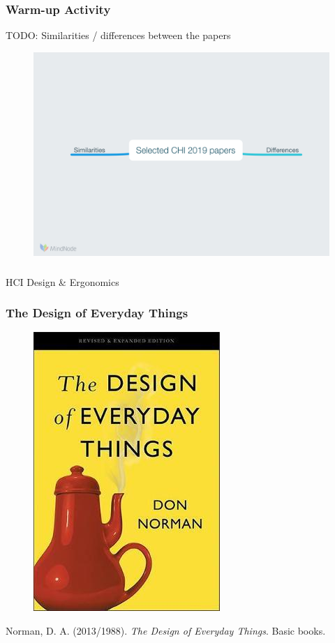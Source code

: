 \documentclass[screen, aspectratio=169]{beamer}
\begin{document}
%
\begin{frame}
\frametitle{Warm-up Activity}
TODO: Similarities / differences between the papers
 \begin{figure}
	\includegraphics[scale=0.28]{img/mindmap-selected-papers.png}
    \end{figure}
\end{frame}
%
%
\begin{frame}
\frametitle{}
\Huge{HCI Design \& Ergonomics}
\end{frame}
%
\begin{frame}
\frametitle{The Design of Everyday Things}
 \begin{figure}
	\includegraphics[scale=0.35]{img/Donald-Norman-The-Design-of-Everyday-Things.jpg}
    \end{figure}
    Norman, D. A. (2013/1988). \emph{The Design of Everyday Things}. Basic books. \cite{Norman.1988.psychology}
\end{frame}
\end{document}
